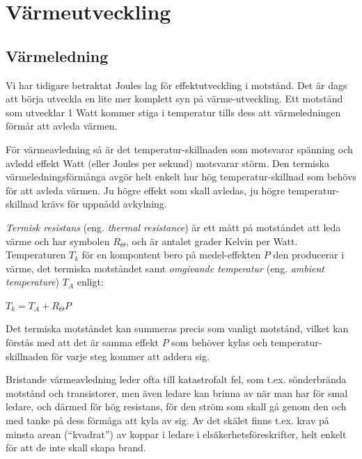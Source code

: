 \section{Värmeutveckling}

\subsection{Värmeledning}

Vi har tidigare betraktat Joules lag för effektutveckling i motstånd.
Det är dags att börja utveckla en lite mer komplett syn på värme-utveckling.
Ett motstånd som utvecklar 1 Watt kommer stiga i temperatur tills dess att
värmeledningen förmår att avleda värmen.

För värmeavledning så är det temperatur-skillnaden som motsvarar spänning och
avledd effekt Watt (eller Joules per sekund) motsvarar störm. Den termiska
värmeledningsförmånga avgör helt enkelt hur hög temperatur-skillnad som behövs
för att avleda värmen. Ju högre effekt som skall avledas, ju högre temperatur-
skillnad krävs för uppnådd avkylning.

\emph{Termisk resistans} (eng. \emph{thermal resistance}) är ett mått på
motståndet att leda värme och har symbolen \(R_\Theta\), och är antalet grader
Kelvin per Watt. Temperaturen \(T_k\) för en kompontent bero på medel-effekten
\(P\) den producerar i värme, det termiska motståndet samt
\emph{omgivande temperatur} (eng. \emph{ambient temperature}) \(T_A\) enligt:

\(T_k = T_A + R_\Theta P\)

Det termiska motståndet kan summeras precis som vanligt motstånd, vilket kan
förstås med att det är samma effekt \(P\) som behöver kylas och temperatur-
skillnaden för varje steg kommer att addera sig.

Bristande värmeavledning leder ofta till katastrofalt fel, som t.ex.
sönderbrända motstånd och transistorer, men även ledare kan brinna av när man
har för smal ledare, och därmed för hög resistans, för den ström som skall gå
genom den och med tanke på dess förmåga att kyla av sig. Av det skälet finns
t.ex. krav på minsta arean (``kvadrat'') av koppar i ledare i
elsäkerhetsföreskrifter, helt enkelt för att de inte skall skapa brand.

